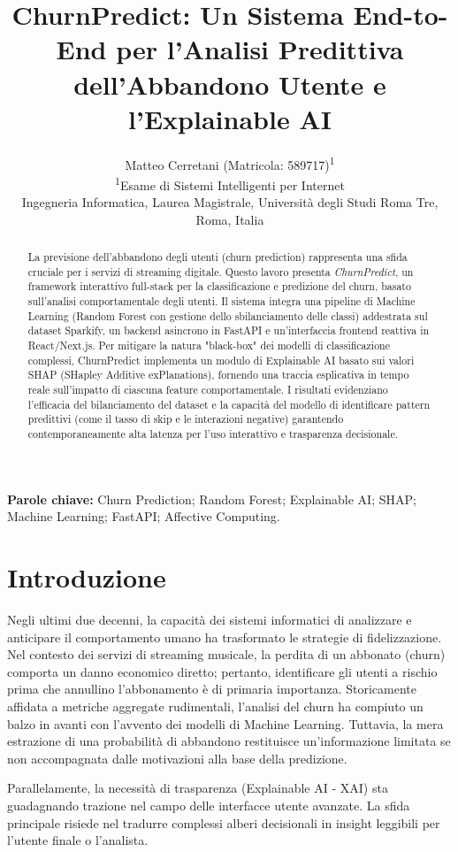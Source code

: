 \documentclass[11pt,a4paper]{article}
\title{\textbf{ChurnPredict: Un Sistema End-to-End per l'Analisi Predittiva dell'Abbandono Utente e l'Explainable AI}}
\author{Matteo Cerretani (Matricola: 589717)\textsuperscript{1}\\
\small \textsuperscript{1}Esame di Sistemi Intelligenti per Internet\\
\small Ingegneria Informatica, Laurea Magistrale, Università degli Studi Roma Tre, Roma, Italia}
\date{}
\begin{document}
\maketitle

\renewcommand{\abstractname}{Sommario}
\begin{abstract}
La previsione dell'abbandono degli utenti (churn prediction) rappresenta una sfida cruciale per i servizi di streaming digitale. Questo lavoro presenta \textit{ChurnPredict}, un framework interattivo full-stack per la classificazione e predizione del churn, basato sull'analisi comportamentale degli utenti. Il sistema integra una pipeline di Machine Learning (Random Forest con gestione dello sbilanciamento delle classi) addestrata sul dataset Sparkify, un backend asincrono in FastAPI e un'interfaccia frontend reattiva in React/Next.js. Per mitigare la natura "black-box" dei modelli di classificazione complessi, ChurnPredict implementa un modulo di Explainable AI basato sui valori SHAP (SHapley Additive exPlanations), fornendo una traccia esplicativa in tempo reale sull'impatto di ciascuna feature comportamentale. I risultati evidenziano l'efficacia del bilanciamento del dataset e la capacità del modello di identificare pattern predittivi (come il tasso di skip e le interazioni negative) garantendo contemporaneamente alta latenza per l'uso interattivo e trasparenza decisionale.
\end{abstract}

\textbf{Parole chiave:} Churn Prediction; Random Forest; Explainable AI; SHAP; Machine Learning; FastAPI; Affective Computing.

\section{Introduzione}
Negli ultimi due decenni, la capacità dei sistemi informatici di analizzare e anticipare il comportamento umano ha trasformato le strategie di fidelizzazione. Nel contesto dei servizi di streaming musicale, la perdita di un abbonato (churn) comporta un danno economico diretto; pertanto, identificare gli utenti a rischio prima che annullino l'abbonamento è di primaria importanza. Storicamente affidata a metriche aggregate rudimentali, l'analisi del churn ha compiuto un balzo in avanti con l'avvento dei modelli di Machine Learning. Tuttavia, la mera estrazione di una probabilità di abbandono restituisce un'informazione limitata se non accompagnata dalle motivazioni alla base della predizione.

Parallelamente, la necessità di trasparenza (Explainable AI - XAI) sta guadagnando trazione nel campo delle interfacce utente avanzate. La sfida principale risiede nel tradurre complessi alberi decisionali in insight leggibili per l'utente finale o l'analista.
\end{document}
